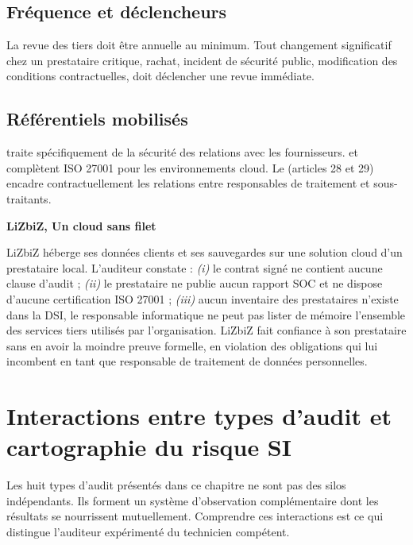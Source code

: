 \subsection{Fréquence et déclencheurs}

La revue des tiers doit être annuelle au minimum. Tout changement significatif chez un prestataire critique, rachat, incident de sécurité public, modification des conditions contractuelles, doit déclencher une revue immédiate.

\subsection{Référentiels mobilisés}

 traite spécifiquement de la sécurité des relations avec les fournisseurs.  et  complètent ISO 27001 pour les environnements cloud. Le  (articles 28 et 29) encadre contractuellement les relations entre responsables de traitement et sous-traitants.

\begin{boxlizbiz}
\textbf{LiZbiZ, Un cloud sans filet}

LiZbiZ héberge ses données clients et ses sauvegardes sur une solution cloud d'un prestataire local. L'auditeur constate : \textit{(i)} le contrat signé ne contient aucune clause d'audit ; \textit{(ii)} le prestataire ne publie aucun rapport SOC et ne dispose d'aucune certification ISO 27001 ; \textit{(iii)} aucun inventaire des prestataires n'existe dans la DSI, le responsable informatique ne peut pas lister de mémoire l'ensemble des services tiers utilisés par l'organisation. LiZbiZ fait confiance à son prestataire sans en avoir la moindre preuve formelle, en violation des obligations qui lui incombent en tant que responsable de traitement de données personnelles.
\end{boxlizbiz}


\section{Interactions entre types d'audit et cartographie du risque SI}

Les huit types d'audit présentés dans ce chapitre ne sont pas des silos indépendants. Ils forment un système d'observation complémentaire dont les résultats se nourrissent mutuellement. Comprendre ces interactions est ce qui distingue l'auditeur expérimenté du technicien compétent.

